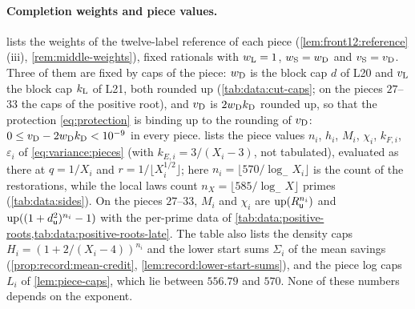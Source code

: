 \paragraph{Completion weights and piece values.}
 lists the weights of the twelve-label reference
of each piece (\cref{lem:front12:reference}(iii), \cref{rem:middle-weights}),
fixed rationals with $w_{\rm L}=1$, $w_{\rm S}=w_{\rm D}$ and $v_{\rm S}=v_{\rm D}$.
Three of them are fixed by caps of the piece: $w_{\rm D}$ is the block cap $d$ of
L20 and $v_{\rm L}$ the block cap $k_{\rm L}$ of L21, both rounded up
(\cref{tab:data:cut-caps}; on the pieces $27$--$33$ the caps of the positive
root), and $v_{\rm D}$ is $2w_{\rm D}k_{\rm D}$ rounded up, so that the protection
\eqref{eq:protection} is binding up to the rounding of $v_{\rm D}$:
$0\le v_{\rm D}-2w_{\rm D}k_{\rm D}<10^{-9}$ in every piece.
 lists the piece values $n_i$, $h_i$, $M_i$,
$\chi_i$, $k_{F,i}$, $\varepsilon_i$ of \eqref{eq:variance:pieces} (with
$k_{E,i}=3/(X_i-3)$, not tabulated), evaluated as there at $q=1/X_i$ and
$r=1/\lfloor X_i^{1/2}\rfloor$; here $n_i=\lfloor570/\log_-X_i\rfloor$ is the
count of the restorations, while the local laws count
$n_X=\lfloor585/\log_-X\rfloor$ primes (\cref{tab:data:sides}). On the pieces
$27$--$33$, $M_i$ and $\chi_i$ are $\operatorname{up}(R_\mathsf u^{n_i})$ and
$\operatorname{up}((1+d_\mathsf u^2)^{n_i}-1)$ with the per-prime data of
\cref{tab:data:positive-roots,tab:data:positive-roots-late}. The table also lists the density caps
$H_i=(1+2/(X_i-4))^{n_i}$ and the lower start sums $\Sigma_i$ of the mean savings
(\cref{prop:record:mean-credit}, \cref{lem:record:lower-start-sums}), and the
piece log caps $L_i$ of \cref{lem:piece-caps}, which lie between $556.79$
and $570$. None of these numbers depends on the exponent.

